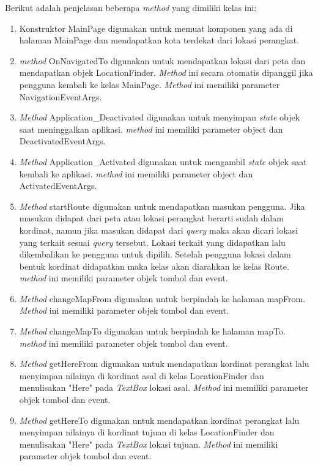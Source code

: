 Berikut adalah penjelasan beberapa \textit{method} yang dimiliki kelas ini:
\begin{enumerate}
	\item Konstruktor MainPage digunakan untuk memuat komponen yang ada di halaman MainPage dan mendapatkan kota terdekat dari lokasi perangkat.
	\item \textit{method} OnNavigatedTo digunakan untuk mendapatkan lokasi dari peta dan mendapatkan objek LocationFinder. \textit{Method} ini secara otomatis dipanggil jika pengguna kembali ke kelas MainPage. \textit{Method} ini memiliki parameter NavigationEventArgs.
	\item \textit{Method} Application\_Deactivated digunakan untuk menyimpan \textit{state} objek saat meninggalkan aplikasi. \textit{method} ini memiliki parameter object dan DeactivatedEventArgs.
	\item \textit{Method} Application\_Activated digunakan untuk mengambil \textit{state} objek saat kembali ke aplikasi. \textit{method} ini memiliki parameter object dan ActivatedEventArgs.
	\item \textit{Method} startRoute digunakan untuk mendapatkan masukan pengguna. Jika masukan didapat dari peta atau lokasi perangkat berarti sudah dalam kordinat, namun jika masukan didapat dari \textit{query} maka akan dicari lokasi yang terkait sesuai \textit{query} tersebut. Lokasi terkait yang didapatkan lalu dikembalikan ke pengguna untuk dipilih. Setelah pengguna lokasi dalam bentuk kordinat didapatkan maka kelas akan diarahkan ke kelas Route. \textit{method} ini memiliki parameter objek tombol dan event.
	\item \textit{Method} changeMapFrom digunakan untuk berpindah ke halaman mapFrom. \textit{Method} ini memiliki parameter objek tombol dan event.
	\item \textit{Method} changeMapTo digunakan untuk berpindah ke halaman mapTo. \textit{method} ini memiliki parameter objek tombol dan event.
	\item \textit{Method} getHereFrom digunakan untuk mendapatkan kordinat perangkat lalu menyimpan nilainya di kordinat asal di kelas LocationFinder dan menulisakan "Here" pada \textit{TextBox} lokasi asal. \textit{Method} ini memiliki parameter objek tombol dan event.
	\item \textit{Method} getHereTo digunakan untuk mendapatkan kordinat perangkat lalu menyimpan nilainya di kordinat tujuan di kelas LocationFinder dan menulisakan "Here" pada \textit{TextBox} lokasi tujuan. \textit{Method} ini memiliki parameter objek tombol dan event.

\end{enumerate}
